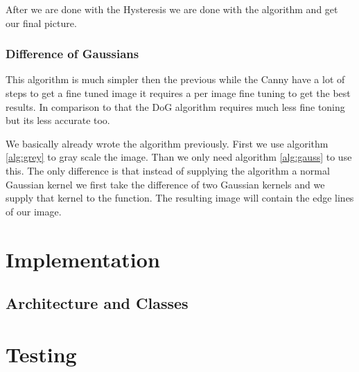 After we are done with the Hysteresis we are done with the algorithm and get our final picture.

\subsubsection{Difference of Gaussians}

This algorithm is much simpler then the previous while the \ac{Canny} have a lot of steps to get a fine tuned image it requires a per image fine tuning to get the best results. In comparison to that the \ac{DoG} algorithm requires much less fine toning but its less accurate too.

We basically already wrote the algorithm previously. First we use algorithm \ref{alg:grey} to gray scale the image. Than we only need algorithm \ref{alg:gauss} to use this. The only difference is that instead of supplying the algorithm a normal Gaussian kernel we first take the difference of two Gaussian kernels and we supply that kernel to the function. The resulting image will contain the edge lines of our image.

\section{Implementation}

\subsection{Architecture and Classes}
\label{chap:Imp_Arc}

\section{Testing}